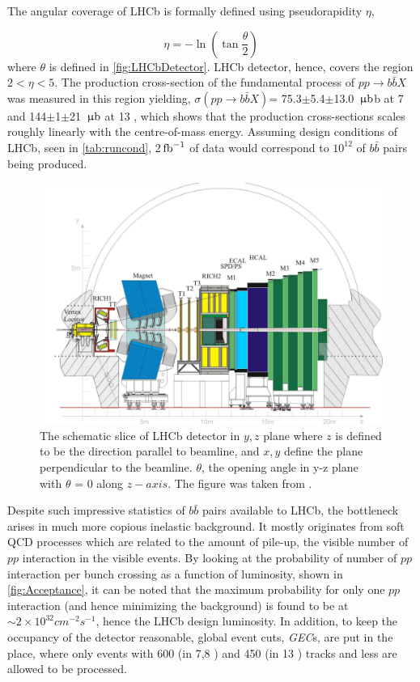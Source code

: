 The angular coverage of \Gls{LHCb} is formally defined using pseudorapidity $\eta$, 

\begin{equation}
	\eta = -\ln (\tan\frac{\theta}{2})
\end{equation}	
where $\theta$ is defined in \autoref{fig:LHCbDetector}. \Gls{LHCb} detector, hence, covers the region $2<\eta<5$. The production cross-section of the fundamental process of $pp\rightarrow b\bar{b}X$ was measured in this region yielding, $\sigma (pp\rightarrow b\bar{b}X)$= 75.3$\pm$5.4$\pm$13.0 ${\rm \,\upmu b}$b at 7 \tev \cite{LHCb-PAPER-2010-002} and 144$\pm$1$\pm$21 ${\rm \,\upmu b}$ at 13 \tev \cite{LHCb-PAPER-2016-031}, which shows that the production cross-sections scales roughly linearly with the centre-of-mass energy. Assuming design conditions of LHCb, seen in \autoref{tab:runcond}, 2$\mbox{\,fb}^{-1}$ of data would correspond to $10^{12}$ of $b\bar{b}$ pairs being produced. 

\begin{figure}
	\centering
	\includegraphics[scale = 0.15]{figs/detector/lhcbdet.pdf}
	\caption{The schematic slice of \Gls{LHCb} detector in $y,z$ plane where $z$ is defined to be the direction parallel to beamline, and $x,y$ define the plane perpendicular to the beamline. $\theta$, the opening angle in y-z plane with $\theta$ = 0 along $z-axis$. The figure was taken from \cite{LHCbdetector}.}
	\label{fig:LHCbDetector}
\end{figure}

Despite such impressive statistics of $b\bar{b}$ pairs available to \Gls{LHCb}, the bottleneck arises in much more copious inelastic background. It mostly originates from soft QCD processes which are related to the amount of pile-up, the visible number of $pp$ interaction in the visible events. By looking at the probability of number of $pp$ interaction per bunch crossing as a function of luminosity, shown in \autoref{fig:Acceptance}, it can be noted that the maximum probability for only one $pp$ interaction (and hence minimizing the background) is found to be at $\sim 2 \times10^{32} cm^{-2} s^{-1}$, hence the LHCb design luminosity. In addition, to keep the occupancy of the detector reasonable, global event cuts, \textit{GEC}s, are put in the place, where only events with 600 (in 7,8 \tev) and 450 (in 13 \tev) tracks and less are allowed to be processed.

